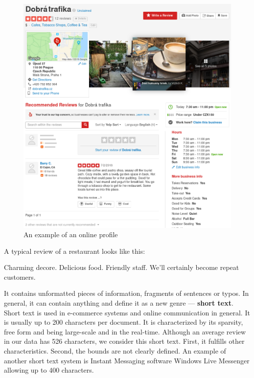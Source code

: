 \begin{figure}[ht]\centering
\includegraphics[width=130mm]{../img/dobra_trafika.png}
\caption{An example of an online profile}
\label{fig:dobra_trafika}
\end{figure}

A typical review of a restaurant looks like this:

\begin{code}
Charming decore. Delicious food. Friendly staff.
We'll certainly become repeat customers.
\end{code}

It contains unformatted pieces of information, fragments of sentences or typos.
In general, it can contain anything and \citet{Song14} define it as a new genre --- \textbf{short text}.
Short text is used in e-commerce systems and online communication in general.
It is usually up to 200 characters per document.
It is characterized by its sparsity, free form and being large-scale and in the real-time.
Although an average review in our data has 526 characters, we consider this short text.
First, it fulfills other characteristics.
Second, the bounds are not clearly defined.
An example of another short text system is Instant Messaging software Windows Live Messenger allowing up to 400 characters.

